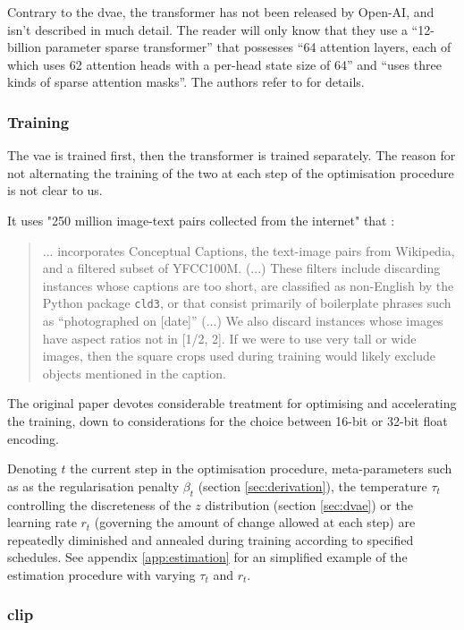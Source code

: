 \documentclass{article}
\begin{document}
\begin{multicols}{2}
Contrary to the \gls{dvae}, the transformer has not been released by Open-AI, and isn't described in much detail.  The reader will only know that they use a \enquote{12-billion parameter sparse transformer} that possesses \enquote{64 attention layers, each of which uses 62 attention heads with a per-head state size of 64} and \enquote{uses three kinds of sparse attention masks}. The authors refer to \citet{long-sequences} for details.

\subsubsection{Training} \label{section:training}

The \gls{vae} is trained first, then the \gls{transformer} is trained separately. The reason for not alternating the training of the two at each step of the optimisation procedure is not clear to us.

It uses "250 million image-text pairs collected from the internet" that :
\blockquote{... incorporates Conceptual Captions, the text-image pairs from Wikipedia, and a filtered subset of YFCC100M. (...) These filters include discarding instances whose captions are too short, are classified as non-English by the Python package \texttt{cld3}, or that consist primarily of boilerplate phrases such as \enquote{photographed on [date]} (...) We also discard instances whose images have aspect ratios not in [1/2, 2]. If we were to use very tall or wide images, then the square crops used during training would likely exclude objects mentioned in the caption.}

The original paper devotes considerable treatment for optimising and accelerating the training, down to considerations for the choice between 16-bit or 32-bit float encoding.

Denoting $t$ the current step in the optimisation procedure, meta-parameters such as as the regularisation penalty $\beta_t$ (section \ref{sec:derivation}), the temperature $\tau_t$ controlling the discreteness of the $z$ distribution (section \ref{sec:dvae}) or the learning rate $r_t$ (governing the amount of change allowed at each step) are repeatedly diminished and annealed during training according to specified schedules. See appendix \ref{app:estimation} for an simplified example of the estimation procedure with varying $\tau_t$ and $r_t$.

\subsubsection{\gls{clip}}


\end{multicols}
\end{document}
